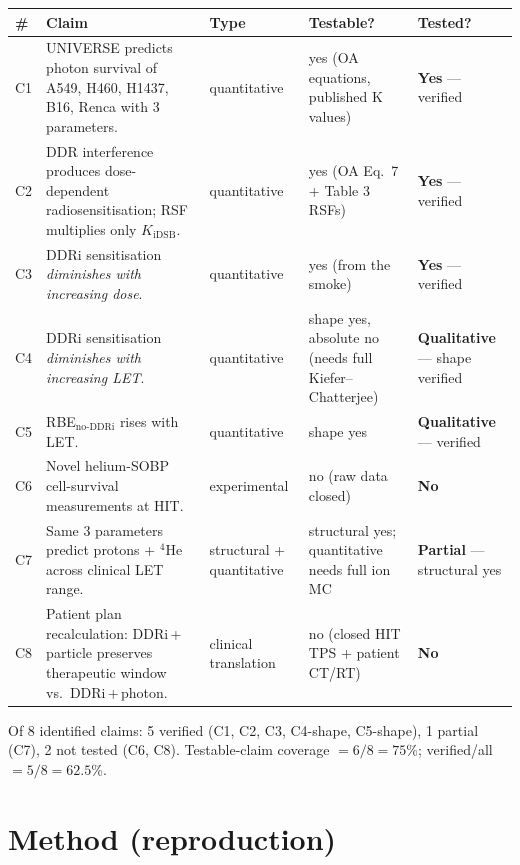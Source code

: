 \documentclass[11pt]{article}
\begin{document}
\begin{longtable}{p{}p{}p{}p{}p{}}
\toprule
\# & Claim & Type & Testable? & Tested? \\
\midrule
\endhead
C1 & UNIVERSE predicts photon survival of A549, H460, H1437, B16, Renca with 3 parameters. & quantitative & yes (OA equations, published K values) & \textbf{Yes} --- verified \\
C2 & DDR interference produces dose-dependent radiosensitisation; RSF multiplies only $K_{\mathrm{iDSB}}$. & quantitative & yes (OA Eq.\ 7 + Table 3 RSFs) & \textbf{Yes} --- verified \\
C3 & DDRi sensitisation \emph{diminishes with increasing dose}. & quantitative & yes (from the smoke) & \textbf{Yes} --- verified \\
C4 & DDRi sensitisation \emph{diminishes with increasing LET}. & quantitative & shape yes, absolute no (needs full Kiefer--Chatterjee) & \textbf{Qualitative} --- shape verified \\
C5 & RBE$_{\mathrm{no\text{-}DDRi}}$ rises with LET. & quantitative & shape yes & \textbf{Qualitative} --- verified \\
C6 & Novel helium-SOBP cell-survival measurements at HIT. & experimental & no (raw data closed) & \textbf{No} \\
C7 & Same 3 parameters predict protons + $^{4}$He across clinical LET range. & structural + quantitative & structural yes; quantitative needs full ion MC & \textbf{Partial} --- structural yes \\
C8 & Patient plan recalculation: DDRi\,+\,particle preserves therapeutic window vs.\ DDRi\,+\,photon. & clinical translation & no (closed HIT TPS + patient CT/RT) & \textbf{No} \\
\bottomrule
\end{longtable}

\noindent Of 8 identified claims: 5 verified (C1, C2, C3, C4-shape, C5-shape), 1 partial (C7),
2 not tested (C6, C8). Testable-claim coverage $=6/8=75\%$; verified/all $=5/8=62.5\%$.

\section{Method (reproduction)}
\end{document}
